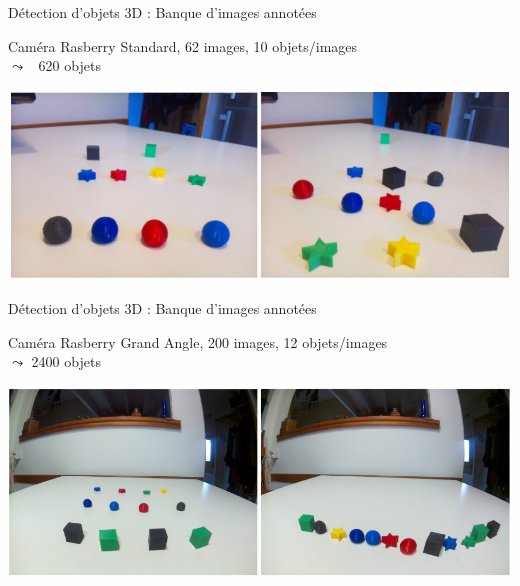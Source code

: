 \documentclass[11pt,serif,mathserif,compress,hyperref={colorlinks}]{beamer}
\begin{document}
\begin{frame}{Détection d'objets 3D : Banque d'images annotées}
  
  \begin{tcolorbox}[title=Images de l'étude préliminaire (caméra Standard)]
    {\small Caméra Rasberry Standard, 62 images, 10 objets/images\\
      $\leadsto$ ~620 objets}
    
     \medskip\includegraphics[width=\textwidth]{images/images_objets_v1.png}
    
  \end{tcolorbox}

\end{frame}

\begin{frame}{Détection d'objets 3D : Banque d'images annotées}
  
  \begin{tcolorbox}[title=Images de l'étude consolidée (caméra Grand Angle)]
    {\small Caméra Rasberry Grand Angle, 200 images, 12 objets/images\\
      $\leadsto$ 2400 objets}
    
     \medskip\includegraphics[width=\textwidth]{images/images_objets_v2.png}
    
  \end{tcolorbox}

\end{frame}
\end{document}
